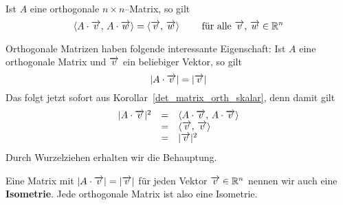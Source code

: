 \begin{korollar}\label{det_matrix_orth_skalar}
Ist $A$ eine orthogonale $n \times n$--Matrix, so gilt  
  	$$ \langle A \cdot \overrightarrow{v},\, A \cdot \overrightarrow{w} \rangle = 
     	\langle \overrightarrow{v},\, \overrightarrow{w} \rangle \qquad \textrm{ für alle }
     	\overrightarrow{v},\, \overrightarrow{w} \in \mathbb R^n $$
\end{korollar}

	
\bigbreak

\begin{notiz} Orthogonale Matrizen haben folgende interessante Eigenschaft: Ist $A$ eine orthogonale 
Matrix und $\overrightarrow{v}$ ein beliebiger Vektor, so gilt
  	$$ \vert A \cdot \overrightarrow{v} \vert = \vert \overrightarrow{v} \vert $$
Das folgt jetzt sofort aus Korollar~\ref{det_matrix_orth_skalar}, denn damit gilt
  	$$ \begin{array} {l c l}
   	\vert A \cdot \overrightarrow{v} \vert^2 
   	& = & \langle A \cdot \overrightarrow{v}, \, A \cdot \overrightarrow{v} \rangle \\
   	& = & \langle \overrightarrow{v},\, \overrightarrow{v} \rangle \\
   	& = & \vert \overrightarrow{v} \vert^2
  	\end{array} $$
Durch Wurzelziehen erhalten wir die Behauptung.

Eine Matrix mit $ \vert A \cdot \overrightarrow{v} \vert = \vert \overrightarrow{v} \vert $ für jeden 
Vektor $\overrightarrow{v} \in \mathbb R^n$ nennen wir auch eine \textbf{Isometrie}. Jede orthogonale Matrix 
ist also eine Isometrie. 
\end{notiz}

